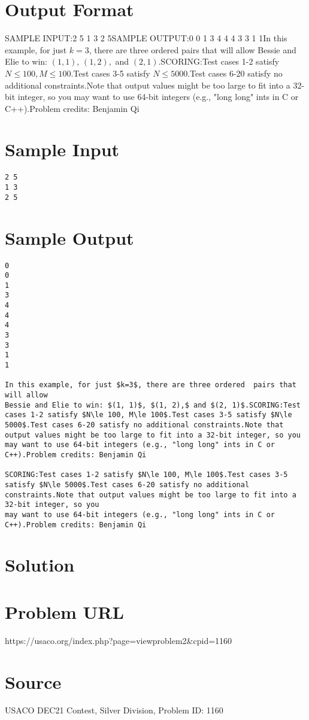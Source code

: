 \documentclass[12pt]{article}
\begin{document}
\section*{Output Format}
SAMPLE INPUT:2 5
1 3
2 5SAMPLE OUTPUT:0
0
1
3
4
4
4
3
3
1
1In this example, for just $k=3$, there are three ordered  pairs that will allow
Bessie and Elie to win: $(1, 1)$, $(1, 2),$ and $(2, 1)$.SCORING:Test cases 1-2 satisfy $N\le 100, M\le 100$.Test cases 3-5 satisfy $N\le 5000$.Test cases 6-20 satisfy no additional constraints.Note that output values might be too large to fit into a 32-bit integer, so you
may want to use 64-bit integers (e.g., "long long" ints in C or C++).Problem credits: Benjamin Qi

\section*{Sample Input}
\begin{verbatim}
2 5
1 3
2 5
\end{verbatim}

\section*{Sample Output}
\begin{verbatim}
0
0
1
3
4
4
4
3
3
1
1

In this example, for just $k=3$, there are three ordered  pairs that will allow
Bessie and Elie to win: $(1, 1)$, $(1, 2),$ and $(2, 1)$.SCORING:Test cases 1-2 satisfy $N\le 100, M\le 100$.Test cases 3-5 satisfy $N\le 5000$.Test cases 6-20 satisfy no additional constraints.Note that output values might be too large to fit into a 32-bit integer, so you
may want to use 64-bit integers (e.g., "long long" ints in C or C++).Problem credits: Benjamin Qi

SCORING:Test cases 1-2 satisfy $N\le 100, M\le 100$.Test cases 3-5 satisfy $N\le 5000$.Test cases 6-20 satisfy no additional constraints.Note that output values might be too large to fit into a 32-bit integer, so you
may want to use 64-bit integers (e.g., "long long" ints in C or C++).Problem credits: Benjamin Qi
\end{verbatim}

\section*{Solution}


\section*{Problem URL}
https://usaco.org/index.php?page=viewproblem2&cpid=1160

\section*{Source}
USACO DEC21 Contest, Silver Division, Problem ID: 1160
\end{document}
